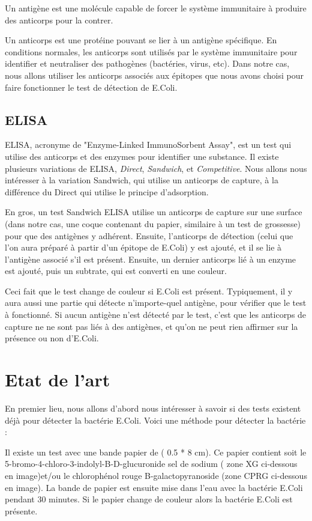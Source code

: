 \documentclass{article}
\begin{document}
      Un antigène est une molécule capable de forcer le système immunitaire à produire des anticorps pour la contrer.

      Un anticorps est une protéine pouvant se lier à un antigène spécifique. En conditions normales, les anticorps sont utilisés par le système immunitaire pour identifier et neutraliser des pathogènes (bactéries, virus, etc). Dans notre cas, nous allons utiliser les anticorps associés aux épitopes que nous avons choisi pour faire fonctionner le test de détection de E.Coli.

    \subsection{ELISA}
      ELISA, acronyme de "Enzyme-Linked ImmunoSorbent Assay", est un test qui utilise des anticorps et des enzymes pour identifier une substance. Il existe plusieurs variations de ELISA, \textit{Direct}, \textit{Sandwich}, et \textit{Competitive}. Nous allons nous intéresser à la variation Sandwich, qui utilise un anticorps de capture, à la différence du Direct qui utilise le principe d'adsorption. \cite{elisa}

      En gros, un test Sandwich ELISA utilise un anticorps de capture sur une surface (dans notre cas, une coque contenant du papier, similaire à un test de grossesse) pour que des antigènes y adhérent. Ensuite, l'anticorps de détection (celui que l'on aura préparé à partir d'un épitope de E.Coli) y est ajouté, et il se lie à l'antigène associé s'il est présent. Ensuite, un dernier anticorps lié à un enzyme est ajouté, puis un subtrate, qui est converti en une couleur.

      Ceci fait que le test change de couleur si E.Coli est présent. Typiquement, il y aura aussi une partie qui détecte n'importe-quel antigène, pour vérifier que le test à fonctionné. Si aucun antigène n'est détecté par le test, c'est que les anticorps de capture ne ne sont pas liés à des antigènes, et qu'on ne peut rien affirmer sur la présence ou non d'E.Coli.

  \section{Etat de l'art}
    En premier lieu, nous allons d'abord nous intéresser à savoir si des tests existent déjà pour détecter la bactérie E.Coli. Voici une méthode pour détecter la bactérie :

    Il existe un test avec une bande papier de ( 0.5 * 8 cm). Ce papier contient soit le 5-bromo-4-chloro-3-indolyl-B-D-glucuronide sel de sodium ( zone XG ci-dessous en image)et/ou le chlorophénol rouge B-galactopyranoside (zone CPRG ci-dessous en image). La bande de papier est ensuite mise dans l'eau avec la bactérie E.Coli pendant 30 minutes. Si le papier change de couleur alors la bactérie E.Coli est présente. \cite{Doe:2009:Online}
\end{document}
